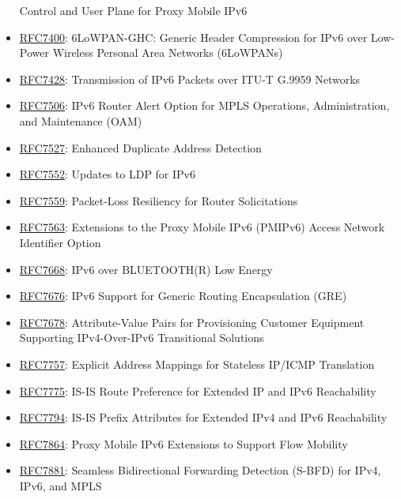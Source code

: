\documentclass[
]{article}
\begin{document}
\begin{itemize}
  Control and User Plane for Proxy Mobile IPv6
\item
  \href{https://www.rfc-editor.org/info/rfc7400}{RFC7400}: 6LoWPAN-GHC:
  Generic Header Compression for IPv6 over Low-Power Wireless Personal
  Area Networks (6LoWPANs)
\item
  \href{https://www.rfc-editor.org/info/rfc7428}{RFC7428}: Transmission
  of IPv6 Packets over ITU-T G.9959 Networks
\item
  \href{https://www.rfc-editor.org/info/rfc7506}{RFC7506}: IPv6 Router
  Alert Option for MPLS Operations, Administration, and Maintenance
  (OAM)
\item
  \href{https://www.rfc-editor.org/info/rfc7527}{RFC7527}: Enhanced
  Duplicate Address Detection
\item
  \href{https://www.rfc-editor.org/info/rfc7552}{RFC7552}: Updates to
  LDP for IPv6
\item
  \href{https://www.rfc-editor.org/info/rfc7559}{RFC7559}: Packet-Loss
  Resiliency for Router Solicitations
\item
  \href{https://www.rfc-editor.org/info/rfc7563}{RFC7563}: Extensions to
  the Proxy Mobile IPv6 (PMIPv6) Access Network Identifier Option
\item
  \href{https://www.rfc-editor.org/info/rfc7668}{RFC7668}: IPv6 over
  BLUETOOTH(R) Low Energy
\item
  \href{https://www.rfc-editor.org/info/rfc7676}{RFC7676}: IPv6 Support
  for Generic Routing Encapsulation (GRE)
\item
  \href{https://www.rfc-editor.org/info/rfc7678}{RFC7678}:
  Attribute-Value Pairs for Provisioning Customer Equipment Supporting
  IPv4-Over-IPv6 Transitional Solutions
\item
  \href{https://www.rfc-editor.org/info/rfc7757}{RFC7757}: Explicit
  Address Mappings for Stateless IP/ICMP Translation
\item
  \href{https://www.rfc-editor.org/info/rfc7775}{RFC7775}: IS-IS Route
  Preference for Extended IP and IPv6 Reachability
\item
  \href{https://www.rfc-editor.org/info/rfc7794}{RFC7794}: IS-IS Prefix
  Attributes for Extended IPv4 and IPv6 Reachability
\item
  \href{https://www.rfc-editor.org/info/rfc7864}{RFC7864}: Proxy Mobile
  IPv6 Extensions to Support Flow Mobility
\item
  \href{https://www.rfc-editor.org/info/rfc7881}{RFC7881}: Seamless
  Bidirectional Forwarding Detection (S-BFD) for IPv4, IPv6, and MPLS

\end{itemize}
\end{document}
